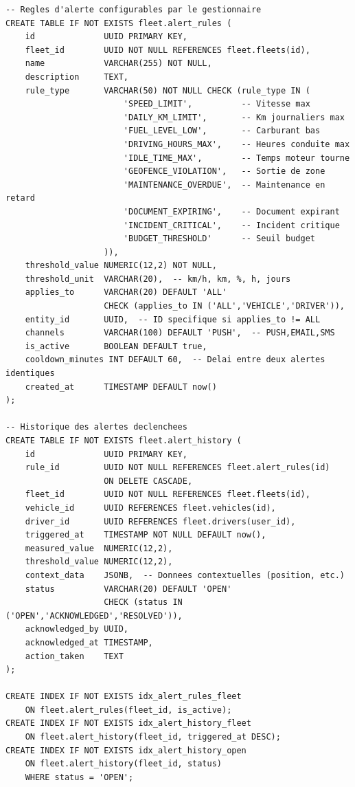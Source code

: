 \documentclass[12pt,a4paper]{report}
\begin{document}
\begin{lstlisting}[style=sqlStyle, caption={Tables du module Alertes et Règles}]
-- Regles d'alerte configurables par le gestionnaire
CREATE TABLE IF NOT EXISTS fleet.alert_rules (
    id              UUID PRIMARY KEY,
    fleet_id        UUID NOT NULL REFERENCES fleet.fleets(id),
    name            VARCHAR(255) NOT NULL,
    description     TEXT,
    rule_type       VARCHAR(50) NOT NULL CHECK (rule_type IN (
                        'SPEED_LIMIT',          -- Vitesse max
                        'DAILY_KM_LIMIT',       -- Km journaliers max
                        'FUEL_LEVEL_LOW',       -- Carburant bas
                        'DRIVING_HOURS_MAX',    -- Heures conduite max
                        'IDLE_TIME_MAX',        -- Temps moteur tourne
                        'GEOFENCE_VIOLATION',   -- Sortie de zone
                        'MAINTENANCE_OVERDUE',  -- Maintenance en retard
                        'DOCUMENT_EXPIRING',    -- Document expirant
                        'INCIDENT_CRITICAL',    -- Incident critique
                        'BUDGET_THRESHOLD'      -- Seuil budget
                    )),
    threshold_value NUMERIC(12,2) NOT NULL,
    threshold_unit  VARCHAR(20),  -- km/h, km, %, h, jours
    applies_to      VARCHAR(20) DEFAULT 'ALL'
                    CHECK (applies_to IN ('ALL','VEHICLE','DRIVER')),
    entity_id       UUID,  -- ID specifique si applies_to != ALL
    channels        VARCHAR(100) DEFAULT 'PUSH',  -- PUSH,EMAIL,SMS
    is_active       BOOLEAN DEFAULT true,
    cooldown_minutes INT DEFAULT 60,  -- Delai entre deux alertes identiques
    created_at      TIMESTAMP DEFAULT now()
);

-- Historique des alertes declenchees
CREATE TABLE IF NOT EXISTS fleet.alert_history (
    id              UUID PRIMARY KEY,
    rule_id         UUID NOT NULL REFERENCES fleet.alert_rules(id)
                    ON DELETE CASCADE,
    fleet_id        UUID NOT NULL REFERENCES fleet.fleets(id),
    vehicle_id      UUID REFERENCES fleet.vehicles(id),
    driver_id       UUID REFERENCES fleet.drivers(user_id),
    triggered_at    TIMESTAMP NOT NULL DEFAULT now(),
    measured_value  NUMERIC(12,2),
    threshold_value NUMERIC(12,2),
    context_data    JSONB,  -- Donnees contextuelles (position, etc.)
    status          VARCHAR(20) DEFAULT 'OPEN'
                    CHECK (status IN ('OPEN','ACKNOWLEDGED','RESOLVED')),
    acknowledged_by UUID,
    acknowledged_at TIMESTAMP,
    action_taken    TEXT
);

CREATE INDEX IF NOT EXISTS idx_alert_rules_fleet
    ON fleet.alert_rules(fleet_id, is_active);
CREATE INDEX IF NOT EXISTS idx_alert_history_fleet
    ON fleet.alert_history(fleet_id, triggered_at DESC);
CREATE INDEX IF NOT EXISTS idx_alert_history_open
    ON fleet.alert_history(fleet_id, status)
    WHERE status = 'OPEN';
\end{lstlisting}
\end{document}
